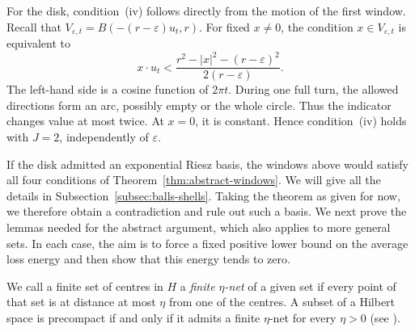 \documentclass[10pt,a4paper]{amsart}
\newcommand\1{\mathbbm{1}}
\newcommand{\eps}{\varepsilon}
\begin{document}
For the disk, condition~(iv) follows directly from the motion of the first window.
Recall that $V_{\eps,t}=B(-(r-\eps)u_t,r)$.
For fixed $x\ne0$, the condition $x\in V_{\eps,t}$ is equivalent to
\begin{equation*}
    x\cdot u_t<\frac{r^2-|x|^2-(r-\eps)^2}{2(r-\eps)}.
\end{equation*}
The left-hand side is a cosine function of $2\pi t$.
During one full turn, the allowed directions form an arc, possibly empty or
the whole circle. Thus the indicator changes value at most twice.
At $x=0$, it is constant. Hence condition~(iv) holds with $J=2$,
independently of $\eps$.

If the disk admitted an exponential Riesz basis, the windows above would
satisfy all four conditions of Theorem~\ref{thm:abstract-windows}.
We will give all the details in Subsection~\ref{subsec:balls-shells}.
Taking the theorem as given for now,
we therefore obtain a contradiction and rule out such a basis.
We next prove the lemmas needed for the abstract argument, which also applies
to more general sets. In each case, the aim is to force a fixed positive lower bound
on the average loss energy and then show that this energy tends to zero.

We call a finite set of centres in $H$ a \emph{finite $\eta$-net} of a given set
if every point of that set is at distance at most $\eta$ from one of the centres.
A subset of a Hilbert space is precompact if and only if it admits
a finite $\eta$-net for every $\eta>0$ (see \cite{Lax02}).
\end{document}
